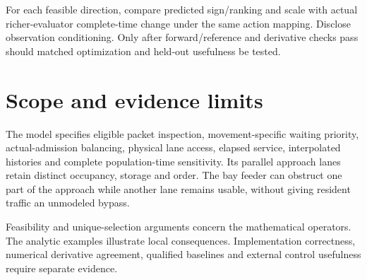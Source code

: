 \documentclass[10pt,a4paper]{article}
\begin{document}
For each feasible direction, compare predicted sign/ranking and scale
with actual richer-evaluator complete-time change under the same action
mapping. Disclose observation conditioning. Only after forward/reference
and derivative checks pass should matched optimization and held-out
usefulness be tested.

\section{Scope and evidence limits}

The model specifies eligible packet inspection, movement-specific waiting
priority, actual-admission balancing, physical lane access, elapsed
service, interpolated histories and complete population-time sensitivity.
Its parallel approach lanes retain distinct occupancy, storage and order.
The bay feeder can obstruct one part of the approach while another lane
remains usable, without giving resident traffic an unmodeled bypass.

Feasibility and unique-selection arguments concern the mathematical
operators. The analytic examples illustrate local consequences.
Implementation correctness, numerical derivative agreement, qualified
baselines and external control usefulness require separate evidence.
\end{document}
